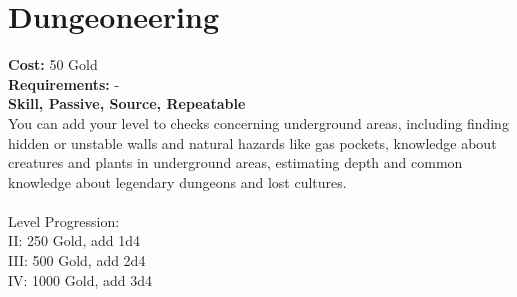 \section{Dungeoneering}
\textbf{Cost:} 50 Gold\\
\textbf{Requirements:} -\\
\textbf{Skill, Passive, Source, Repeatable}\\
You can add your level to checks concerning underground areas, including finding hidden or unstable walls and natural hazards like gas pockets, knowledge about creatures and plants in underground areas, estimating depth and common knowledge about legendary dungeons and lost cultures.\\
\\
Level Progression:\\
II: 250 Gold, add 1d4\\
III: 500 Gold, add 2d4\\
IV: 1000 Gold, add 3d4\\